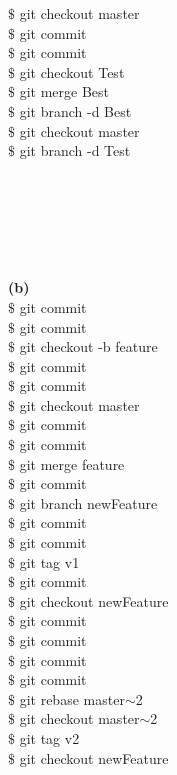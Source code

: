 \documentclass{article}
\theoremstyle{definition}
\begin{document}
$ \$ $ git checkout master\\
$ \$ $ git commit\\
$ \$ $ git commit\\
$ \$ $ git checkout Test\\
$ \$ $ git merge Best\\
$ \$ $ git branch -d Best\\
$ \$ $ git checkout master\\
$ \$ $ git branch -d Test\\\\\\\\\\\\\\



\textbf{(b)}\\
$ \$ $ git commit\\
$ \$ $ git commit\\
$ \$ $ git checkout -b feature\\
$ \$ $ git commit\\
$ \$ $ git commit\\
$ \$ $ git checkout master\\
$ \$ $ git commit\\
$ \$ $ git commit\\
$ \$ $ git merge feature\\
$ \$ $ git commit\\
$ \$ $ git branch newFeature\\
$ \$ $ git commit\\
$ \$ $ git commit\\
$ \$ $ git tag v1\\
$ \$ $ git commit\\
$ \$ $ git checkout newFeature\\
$ \$ $ git commit\\
$ \$ $ git commit\\
$ \$ $ git commit\\
$ \$ $ git commit\\
$ \$ $ git rebase master$\sim$2\\
$ \$ $ git checkout master$\sim$2\\
$ \$ $ git tag v2\\
$ \$ $ git checkout newFeature\\\\\\\\\\\\\\\\\\\\\\\\
\end{document}
